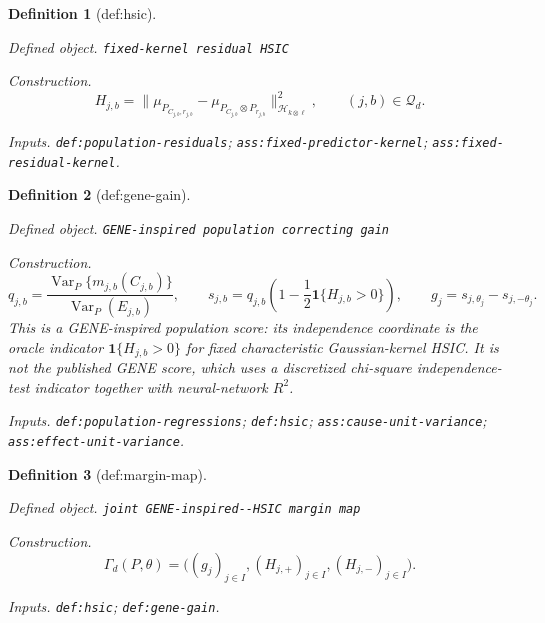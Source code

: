 \documentclass{article}
\newtheorem{definition}{Definition}
\begin{document}
\begin{definition}[def:hsic]\label{def:hsic}
\par\smallskip\noindent\emph{Defined object.} \texttt{fixed-\allowbreak{}kernel residual HSIC}
\par\smallskip\noindent\emph{Construction.} \[H_{j,b}=\bigl\|\mu_{P_{C_{j,b},r_{j,b}}}-\mu_{P_{C_{j,b}}\otimes P_{r_{j,b}}}\bigr\|^2_{\mathcal H_{k\otimes\ell}},\qquad (j,b)\in\mathcal Q_d.\]
\par\smallskip\noindent\emph{Inputs.} \texttt{def:\allowbreak{}population-\allowbreak{}residuals}; \texttt{ass:\allowbreak{}fixed-\allowbreak{}predictor-\allowbreak{}kernel}; \texttt{ass:\allowbreak{}fixed-\allowbreak{}residual-\allowbreak{}kernel}.
\end{definition}

\begin{definition}[def:gene-gain]\label{def:gene-gain}
\par\smallskip\noindent\emph{Defined object.} \texttt{GENE-\allowbreak{}inspired population correcting gain}
\par\smallskip\noindent\emph{Construction.} \[
q_{j,b}=\frac{\operatorname{Var}_P\{m_{j,b}(C_{j,b})\}}{\operatorname{Var}_P(E_{j,b})},\qquad
s_{j,b}=q_{j,b}\left(1-\frac12\mathbf 1\{H_{j,b}>0\}\right),\qquad
g_j=s_{j,\theta_j}-s_{j,-\theta_j}.
\]
This is a GENE-inspired population score: its independence coordinate is the oracle indicator \(\mathbf 1\{H_{j,b}>0\}\) for fixed characteristic Gaussian-kernel HSIC.  It is not the published GENE score, which uses a discretized chi-square independence-test indicator together with neural-network \(R^2\).
\par\smallskip\noindent\emph{Inputs.} \texttt{def:\allowbreak{}population-\allowbreak{}regressions}; \texttt{def:\allowbreak{}hsic}; \texttt{ass:\allowbreak{}cause-\allowbreak{}unit-\allowbreak{}variance}; \texttt{ass:\allowbreak{}effect-\allowbreak{}unit-\allowbreak{}variance}.
\end{definition}

\begin{definition}[def:margin-map]\label{def:margin-map}
\par\smallskip\noindent\emph{Defined object.} \texttt{joint GENE-\allowbreak{}inspired-\allowbreak{}-\allowbreak{}HSIC margin map}
\par\smallskip\noindent\emph{Construction.} \[
\Gamma_d(P,\theta)=\bigl((g_j)_{j\in I},(H_{j,+})_{j\in I},(H_{j,-})_{j\in I}\bigr).
\]
\par\smallskip\noindent\emph{Inputs.} \texttt{def:\allowbreak{}hsic}; \texttt{def:\allowbreak{}gene-\allowbreak{}gain}.
\end{definition}
\end{document}
